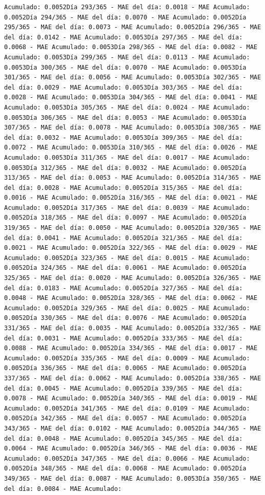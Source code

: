 \documentclass[
]{book}
\begin{document}
\begin{verbatim}
Acumulado: 0.0052Día 293/365 - MAE del día: 0.0018 - MAE Acumulado: 0.0052Día 294/365 - MAE del día: 0.0070 - MAE Acumulado: 0.0052Día 295/365 - MAE del día: 0.0073 - MAE Acumulado: 0.0052Día 296/365 - MAE del día: 0.0142 - MAE Acumulado: 0.0053Día 297/365 - MAE del día: 0.0068 - MAE Acumulado: 0.0053Día 298/365 - MAE del día: 0.0082 - MAE Acumulado: 0.0053Día 299/365 - MAE del día: 0.0113 - MAE Acumulado: 0.0053Día 300/365 - MAE del día: 0.0070 - MAE Acumulado: 0.0053Día 301/365 - MAE del día: 0.0056 - MAE Acumulado: 0.0053Día 302/365 - MAE del día: 0.0029 - MAE Acumulado: 0.0053Día 303/365 - MAE del día: 0.0028 - MAE Acumulado: 0.0053Día 304/365 - MAE del día: 0.0041 - MAE Acumulado: 0.0053Día 305/365 - MAE del día: 0.0024 - MAE Acumulado: 0.0053Día 306/365 - MAE del día: 0.0053 - MAE Acumulado: 0.0053Día 307/365 - MAE del día: 0.0078 - MAE Acumulado: 0.0053Día 308/365 - MAE del día: 0.0032 - MAE Acumulado: 0.0053Día 309/365 - MAE del día: 0.0072 - MAE Acumulado: 0.0053Día 310/365 - MAE del día: 0.0026 - MAE Acumulado: 0.0053Día 311/365 - MAE del día: 0.0017 - MAE Acumulado: 0.0053Día 312/365 - MAE del día: 0.0032 - MAE Acumulado: 0.0052Día 313/365 - MAE del día: 0.0053 - MAE Acumulado: 0.0052Día 314/365 - MAE del día: 0.0028 - MAE Acumulado: 0.0052Día 315/365 - MAE del día: 0.0016 - MAE Acumulado: 0.0052Día 316/365 - MAE del día: 0.0021 - MAE Acumulado: 0.0052Día 317/365 - MAE del día: 0.0039 - MAE Acumulado: 0.0052Día 318/365 - MAE del día: 0.0097 - MAE Acumulado: 0.0052Día 319/365 - MAE del día: 0.0050 - MAE Acumulado: 0.0052Día 320/365 - MAE del día: 0.0041 - MAE Acumulado: 0.0052Día 321/365 - MAE del día: 0.0021 - MAE Acumulado: 0.0052Día 322/365 - MAE del día: 0.0029 - MAE Acumulado: 0.0052Día 323/365 - MAE del día: 0.0015 - MAE Acumulado: 0.0052Día 324/365 - MAE del día: 0.0061 - MAE Acumulado: 0.0052Día 325/365 - MAE del día: 0.0020 - MAE Acumulado: 0.0052Día 326/365 - MAE del día: 0.0183 - MAE Acumulado: 0.0052Día 327/365 - MAE del día: 0.0048 - MAE Acumulado: 0.0052Día 328/365 - MAE del día: 0.0062 - MAE Acumulado: 0.0052Día 329/365 - MAE del día: 0.0025 - MAE Acumulado: 0.0052Día 330/365 - MAE del día: 0.0076 - MAE Acumulado: 0.0052Día 331/365 - MAE del día: 0.0035 - MAE Acumulado: 0.0052Día 332/365 - MAE del día: 0.0031 - MAE Acumulado: 0.0052Día 333/365 - MAE del día: 0.0088 - MAE Acumulado: 0.0052Día 334/365 - MAE del día: 0.0017 - MAE Acumulado: 0.0052Día 335/365 - MAE del día: 0.0009 - MAE Acumulado: 0.0052Día 336/365 - MAE del día: 0.0065 - MAE Acumulado: 0.0052Día 337/365 - MAE del día: 0.0062 - MAE Acumulado: 0.0052Día 338/365 - MAE del día: 0.0045 - MAE Acumulado: 0.0052Día 339/365 - MAE del día: 0.0078 - MAE Acumulado: 0.0052Día 340/365 - MAE del día: 0.0019 - MAE Acumulado: 0.0052Día 341/365 - MAE del día: 0.0109 - MAE Acumulado: 0.0052Día 342/365 - MAE del día: 0.0057 - MAE Acumulado: 0.0052Día 343/365 - MAE del día: 0.0102 - MAE Acumulado: 0.0052Día 344/365 - MAE del día: 0.0048 - MAE Acumulado: 0.0052Día 345/365 - MAE del día: 0.0064 - MAE Acumulado: 0.0052Día 346/365 - MAE del día: 0.0036 - MAE Acumulado: 0.0052Día 347/365 - MAE del día: 0.0066 - MAE Acumulado: 0.0052Día 348/365 - MAE del día: 0.0068 - MAE Acumulado: 0.0052Día 349/365 - MAE del día: 0.0087 - MAE Acumulado: 0.0053Día 350/365 - MAE del día: 0.0084 - MAE Acumulado: 
\end{verbatim}
\end{document}
